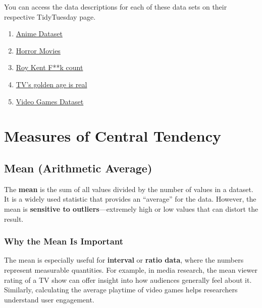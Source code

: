 \documentclass[
]{book}
\providecommand{\tightlist}{%
  \setlength{\itemsep}{0pt}\setlength{\parskip}{0pt}}
\begin{document}
You can access the data descriptions for each of these data sets on their respective TidyTuesday page.

\begin{enumerate}
\def\labelenumi{\arabic{enumi}.}
\tightlist
\item
  \href{https://github.com/rfordatascience/tidytuesday/blob/master/data/2019/2019-04-23/readme.md}{Anime Dataset}
\item
  \href{https://github.com/rfordatascience/tidytuesday/blob/master/data/2022/2022-11-01/readme.md}{Horror Movies}
\item
  \href{https://github.com/rfordatascience/tidytuesday/blob/master/data/2023/2023-09-26/readme.md}{Roy Kent F**k count}
\item
  \href{https://github.com/rfordatascience/tidytuesday/blob/master/data/2019/2019-01-08/readme.md}{TV's golden age is real}
\item
  \href{https://github.com/rfordatascience/tidytuesday/blob/master/data/2019/2019-07-30//readme.md}{Video Games Dataset}
\end{enumerate}

\section{Measures of Central Tendency}\label{measures-of-central-tendency}

\subsection*{Mean (Arithmetic Average)}\label{mean-arithmetic-average}

The \textbf{mean} is the sum of all values divided by the number of values in a dataset. It is a widely used statistic that provides an ``average'' for the data. However, the mean is \textbf{sensitive to outliers}---extremely high or low values that can distort the result.

\subsubsection*{Why the Mean Is Important}\label{why-the-mean-is-important}

The mean is especially useful for \textbf{interval} or \textbf{ratio data}, where the numbers represent measurable quantities. For example, in media research, the mean viewer rating of a TV show can offer insight into how audiences generally feel about it. Similarly, calculating the average playtime of video games helps researchers understand user engagement.
\end{document}
